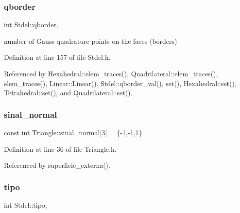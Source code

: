\mbox{\label{classStdel_a63a106b928d211c71d5fec6449ef4d51}} 
\subsubsection{\texorpdfstring{qborder}{qborder}}
{\footnotesize\ttfamily int Stdel\+::qborder\hspace{0.3cm}{\ttfamily [protected]}, {\ttfamily [inherited]}}



number of Gauss quadrature points on the faces (borders) 



Definition at line 157 of file Stdel.\+h.



Referenced by Hexahedral\+::elem\+\_\+traces(), Quadrilateral\+::elem\+\_\+traces(), elem\+\_\+traces(), Linear\+::\+Linear(), Stdel\+::qborder\+\_\+val(), set(), Hexahedral\+::set(), Tetrahedral\+::set(), and Quadrilateral\+::set().

\mbox{\label{classTriangle_a8cd0ca9207ef546b87d71b3d2d1d69c9}} 
\subsubsection{\texorpdfstring{sinal\+\_\+normal}{sinal\_normal}}
{\footnotesize\ttfamily const int Triangle\+::sinal\+\_\+normal\mbox{[}3\mbox{]} = \{-\/1,-\/1,1\}\hspace{0.3cm}{\ttfamily [private]}}



Definition at line 36 of file Triangle.\+h.



Referenced by superficie\+\_\+externa().

\mbox{\label{classStdel_a68f8781a42728758ccde39e15cd319ed}} 
\subsubsection{\texorpdfstring{tipo}{tipo}}
{\footnotesize\ttfamily int Stdel\+::tipo\hspace{0.3cm}{\ttfamily [protected]}, {\ttfamily [inherited]}}



